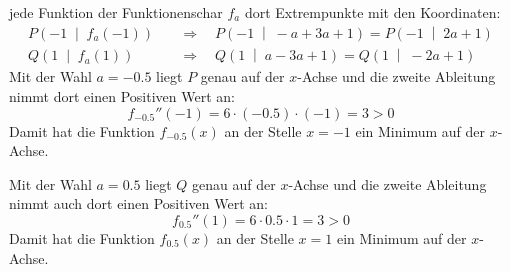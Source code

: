 \begin{exercise}
    jede Funktion der Funktionenschar
    $f_a$ dort Extrempunkte mit den
    Koordinaten:
    \begin{equation*}
      \begin{split}
        P\left(-1\;\middle|\;f_{a}(-1)\right)
        \quad&\Rightarrow\quad
        P\left(-1\;\middle|\;-a+3a+1\right)
        =
        P\left(-1\;\middle|\;2a+1\right)
        \\[1ex]
        Q\left(1\;\middle|\;f_{a}(1)\right)
        \quad&\Rightarrow\quad
        Q\left(1\;\middle|\;a-3a+1\right)
        =
        Q\left(1\;\middle|\;-2a+1\right)
      \end{split}
    \end{equation*}
    Mit der Wahl $a=\num{-0.5}$ liegt
    $P$ genau auf der $x$-Achse und die
    zweite Ableitung nimmt dort einen
    Positiven Wert an:
    \begin{equation*}
      f_{\num{-0.5}}''(-1)
      =6\cdot(\num{-0.5})\cdot(\num{-1})
      =3
      >0
    \end{equation*}
    Damit hat die Funktion
    $f_{\num{-0.5}}(x)$ an der Stelle
    $x=-1$ ein Minimum auf der $x$-Achse.
    \par
    Mit der Wahl $a=\num{0.5}$ liegt
    $Q$ genau auf der $x$-Achse und die
    zweite Ableitung nimmt auch dort
    einen Positiven Wert an:
    \begin{equation*}
      f_{\num{0.5}}''(1)
      =6\cdot\num{0.5}\cdot\num{1}
      =3
      >0
    \end{equation*}
    Damit hat die Funktion
    $f_{\num{0.5}}(x)$ an der Stelle
    $x=1$ ein Minimum auf der $x$-Achse.
    \begin{center}
\end{center}
\end{exercise}
